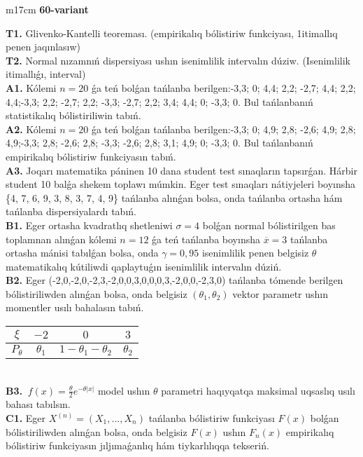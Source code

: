 \documentclass{article}
\begin{document}
\begin{tabular}{m{17cm}}
\textbf{60-variant}
\newline

\textbf{T1.} 
Glivenko-Kantelli teoreması. (empirikalıq bólistiriw funkciyası, 1itimallıq penen jaqınlasıw)
 \\
\textbf{T2.} 
Normal nızamnıń dispersiyası ushın isenimlilik intervalın dúziw. (Isenimlilik itimallıǵı, interval)
 \\
\textbf{A1.} 
Kólemi \(n = 20\) ǵa teń bolǵan tańlanba berilgen:-3,3; 0; 4,4; 2,2; -2,7; 4,4; 2,2; 4,4;-3,3; 2,2; -2,7; 2,2; -3,3; -2,7; 2,2; 3,4; 4,4; 0; -3,3; 0. Bul tańlanbanıń statistikalıq bólistiriliwin tabıń.
 \\
\textbf{A2.} 
Kólemi \(n = 20\) ǵa teń bolǵan tańlanba berilgen:-3,3; 0; 4,9; 2,8; -2,6; 4,9; 2,8; 4,9;-3,3; 2,8; -2,6; 2,8; -3,3; -2,6; 2,8; 3,1; 4,9; 0; -3,3; 0. Bul tańlanbanıń empirikalıq bólistiriw funkciyasın tabıń.
 \\
\textbf{A3.} 
Joqarı matematika páninen 10 dana student test sınaqların tapsırǵan. Hárbir student 10 balǵa shekem toplawı múmkin. Eger test sınaqları nátiyjeleri boyınsha \{4, 7, 6, 9, 3, 8, 3, 7, 4, 9\} tańlanba alınǵan bolsa, onda tańlanba ortasha hám tańlanba dispersiyalardı tabıń.
 \\
\textbf{B1.} 
Eger ortasha kvadratlıq shetleniwi \(\sigma = 4\) bolǵan normal bólistirilgen bas toplamnan alınǵan kólemi \(n = 12\) ǵa teń tańlanba boyınsha \(\overline{x} = 3\) tańlanba ortasha mánisi tabılǵan bolsa, onda \(\gamma = 0,95\) isenimlilik penen belgisiz \(\theta\) matematikalıq kútiliwdi qaplaytuǵın isenimlilik intervalın dúziń.
 \\
\textbf{B2.} 
Eger (-2,0,-2,0,-2,3,-2,0,0,3,0,0,0,3,-2,0,0,-2,3,0) tańlanba tómende berilgen bólistiriliwden alınǵan bolsa, onda belgisiz \(\left( \theta_{1},\theta_{2} \right)\) vektor parametr ushın momentler usılı bahalasın tabıń.
\begin{tabular}{|c|c|c|c|}
  \hline
$\xi$ &
$- 2$ &
$0$ &
$3$\\
\hline
\(P_{\theta}\) & \(\theta_{1}\) & \(1 - \theta_{1} - \theta_{2}\) & \(\theta_{2}\) \\
\hline
\end{tabular}
 \\
\textbf{B3.} 
\(\ f(x) = \frac{\theta}{2}e^{- \theta|x|}\) model ushın \(\theta\) parametri haqıyqatqa maksimal uqsaslıq usılı bahası tabılsın.
 \\
\textbf{C1.} 
Eger \(X^{(n)} = \left( X_{1},...,X_{n} \right)\) tańlanba bólistiriw funkciyası \(F(x)\) bolǵan bólistiriliwden alınǵan bolsa, onda belgisiz \(F(x)\) ushın \(F_{n}(x)\) empirikalıq bólistiriw funkciyasın jıljımaǵanlıq hám tiykarlılıqqa tekseriń.

\end{tabular}
\end{document}
